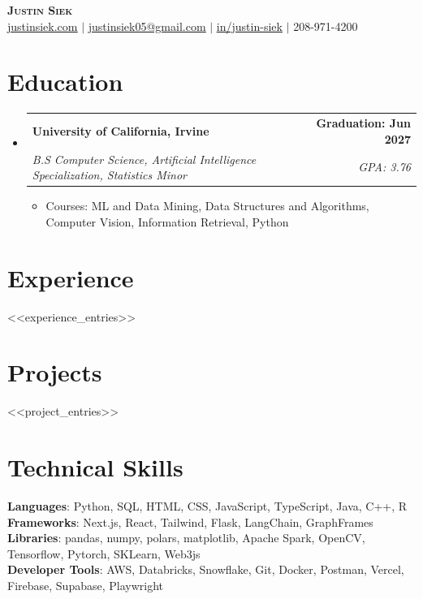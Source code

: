 \documentclass[letterpaper,11pt]{article}
\makeatletter
\newcommand{\resumeItem}[1]{
  \item\small{
    {#1 \vspace{-2pt}}
  }
}
\newcommand{\resumeSubheading}[4]{
  \vspace{-2pt}\item
    \begin{tabular*}{0.97\textwidth}[t]{l@{\extracolsep{\fill}}r}
      \textbf{#1} & #2 \\
      \textit{\small#3} & \textit{\small #4} \\
    \end{tabular*}\vspace{-7pt}
}
\newcommand{\resumeSubHeadingListStart}{\begin{itemize}[leftmargin=0.10in, label={}]}
\newcommand{\resumeSubHeadingListEnd}{\end{itemize}}
\newcommand{\resumeItemListStart}{\begin{itemize}[leftmargin=0.15in]}
\newcommand{\resumeItemListEnd}{\end{itemize}\vspace{-5pt}}
\makeatother
\begin{document}
\begin{center}
    \textbf{\Huge \scshape Justin Siek} \\ \vspace{1pt}
    \href{https://justinsiek.com}{\underline{justinsiek.com}} $|$
    \href{mailto:siekj@uci.edu}{\underline{justinsiek05@gmail.com}} $|$ 
    \href{https://linkedin.com/in/justin-siek}{\underline{in/justin-siek}} $|$
    \small 208-971-4200
    
    
\end{center}


\section{Education}
  \resumeSubHeadingListStart
    \resumeSubheading
      {University of California, Irvine}{\textbf{Graduation: Jun 2027}}
      {B.S Computer Science, Artificial Intelligence Specialization, Statistics Minor}{GPA: 3.76}
      \resumeItemListStart
        \resumeItem{Courses: ML and Data Mining, Data Structures and Algorithms, Computer Vision, Information Retrieval, Python}
    \resumeItemListEnd
  \resumeSubHeadingListEnd


\section{Experience}
  \resumeSubHeadingListStart
<<experience_entries>>
  \resumeSubHeadingListEnd


\section{Projects}
    \resumeSubHeadingListStart
<<project_entries>>
    \resumeSubHeadingListEnd



%
\section{Technical Skills}
 \begin{itemize}[leftmargin=0.15in, label={}]
    \small{\item{
     \textbf{Languages}{: Python, SQL, HTML, CSS, JavaScript, TypeScript, Java, C++, R} \\
     \textbf{Frameworks}{: Next.js, React, Tailwind, Flask, LangChain, GraphFrames} \\
     \textbf{Libraries}{: pandas, numpy, polars, matplotlib, Apache Spark, OpenCV, Tensorflow, Pytorch, SKLearn, Web3js} \\
     \textbf{Developer Tools}{: AWS, Databricks, Snowflake, Git, Docker, Postman, Vercel, Firebase, Supabase, Playwright} 
     }}
 \end{itemize}


\end{document}
